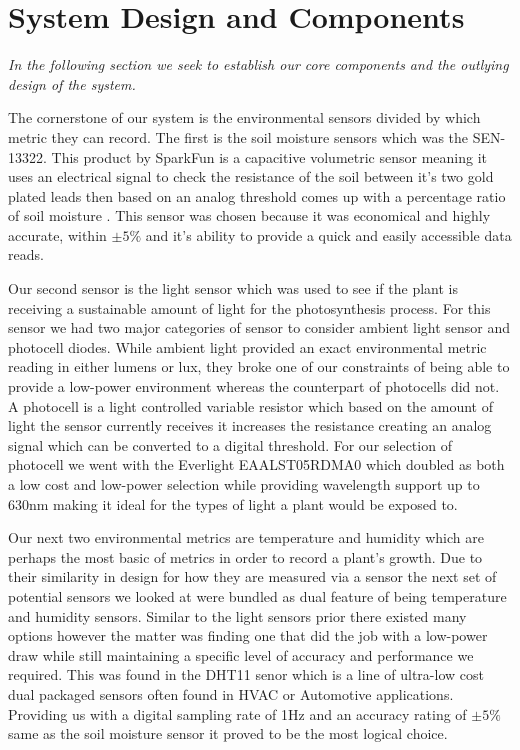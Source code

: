 \documentclass[comsoc, 12pt]{IEEEtran}
\begin{document}
\section{System Design and Components}
\begin{center}
    \textit{In the following section we seek to establish our core components and the outlying design of the system.}
\end{center}
The cornerstone of our system is the environmental sensors divided by which metric they can record. The first is the soil moisture sensors which was the SEN-13322. This product by SparkFun is a capacitive volumetric sensor meaning it uses an electrical signal to check the resistance of the soil between it's two gold plated leads then based on an analog threshold comes up with a percentage ratio of soil moisture \cite{WEBSITE:1}. This sensor was chosen because it was economical and highly accurate, within \begin{math} \pm5\% \end{math} and it's ability to provide a quick and easily accessible data reads.\par
Our second sensor is the light sensor which was used to see if the plant is receiving a sustainable amount of light for the photosynthesis process. For this sensor we had two major categories of sensor to consider ambient light sensor and photocell diodes. While ambient light provided an exact environmental metric reading in either lumens or lux, they broke one of our constraints of being able to provide a low-power environment whereas the counterpart of photocells did not. A photocell is a light controlled variable resistor which based on the amount of light the sensor currently receives it increases the resistance creating an analog signal which can be converted to a digital threshold.\cite{WEBSITE:2} For our selection of photocell we went with the Everlight EAALST05RDMA0 which doubled as both a low cost and low-power selection while providing wavelength support up to 630nm making it ideal for the types of light a plant would be exposed to. \par
Our next two environmental metrics are temperature and humidity which are perhaps the most basic of metrics in order to record a plant's growth. Due to their similarity in design for how they are measured via a sensor the next set of potential sensors we looked at were bundled as dual feature of being temperature and humidity sensors. Similar to the light sensors prior there existed many options however the matter was finding one that did the job with a low-power draw while still maintaining a specific level of accuracy and performance we required. This was found in the DHT11 senor which is a line of ultra-low cost dual packaged sensors often found in HVAC or Automotive applications. \cite{WEBSITE:3} Providing us with a digital sampling rate of 1Hz and an accuracy rating of \begin{math} \pm5\% \end{math} same as the soil moisture sensor it proved to be the most logical choice.\par
\end{document}
